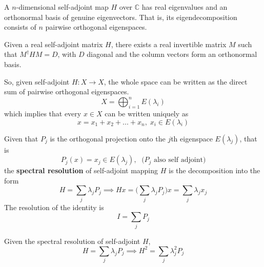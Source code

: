   \begin{theorem}
    A $n$-dimensional self-adjoint map $H$ over $\mathbb{C}$ has real eigenvalues and an orthonormal basis of genuine eigenvectors. That is, its eigendecomposition consists of $n$ pairwise orthogonal eigenspaces. 
  \end{theorem}

  \begin{corollary}
    Given a real self-adjoint matrix $H$, there exists a real invertible matrix $M$ such that $M^\dagger H M = D$, with $D$ diagonal and the column vectors form an orthonormal basis.

    So, given self-adjoint $H: X \longrightarrow X$, the whole space can be written as the direct sum of pairwise orthogonal eigenspaces. 
    \begin{equation}
      X = \bigoplus_{i=1}^n E(\lambda_i)
    \end{equation}
    which implies that every $x \in X$ can be written uniquely as 
    \begin{equation}
      x = x_1 + x_2 + ... + x_n, \; x_i \in E(\lambda_i) 
    \end{equation}
  \end{corollary}

  \begin{definition}
    Given that $P_j$ is the orthogonal projection onto the $j$th eigenspace $E(\lambda_j)$, that is
    \begin{equation}
      P_j (x) = x_j \in E(\lambda_j), \; \text{ ($P_j$ also self adjoint)}
    \end{equation}
    the \textbf{spectral resolution} of self-adjoint mapping $H$ is the decomposition into the form 
    \begin{equation}
      H = \sum_j \lambda_j P_j \implies H x = \bigg( \sum_j \lambda_j P_j \bigg) x = \sum_j \lambda_j x_j
    \end{equation}
    The resolution of the identity is
    \begin{equation}
      I = \sum_j P_j
    \end{equation}
  \end{definition}

  \begin{proposition}
    Given the spectral resolution of self-adjoint $H$, 
    \begin{equation}
      H  = \sum_j \lambda_j P_j \implies H^2 = \sum_j \lambda_j^2 P_j
    \end{equation}
  \end{proposition}

